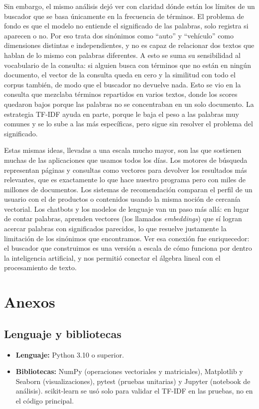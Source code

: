 \documentclass[12pt,a4paper]{article}
\begin{document}
Sin embargo, el mismo análisis dejó ver con claridad dónde están los límites de un buscador que se basa únicamente en la frecuencia de términos. El problema de fondo es que el modelo no entiende el significado de las palabras, solo registra si aparecen o no. Por eso trata dos sinónimos como ``auto'' y ``vehículo'' como dimensiones distintas e independientes, y no es capaz de relacionar dos textos que hablan de lo mismo con palabras diferentes. A esto se suma su sensibilidad al vocabulario de la consulta: si alguien busca con términos que no están en ningún documento, el vector de la consulta queda en cero y la similitud con todo el corpus también, de modo que el buscador no devuelve nada. Esto se vio en la consulta que mezclaba términos repartidos en varios textos, donde los scores quedaron bajos porque las palabras no se concentraban en un solo documento. La estrategia TF-IDF ayuda en parte, porque le baja el peso a las palabras muy comunes y se lo sube a las más específicas, pero sigue sin resolver el problema del significado.

Estas mismas ideas, llevadas a una escala mucho mayor, son las que sostienen muchas de las aplicaciones que usamos todos los días. Los motores de búsqueda representan páginas y consultas como vectores para devolver los resultados más relevantes, que es exactamente lo que hace nuestro programa pero con miles de millones de documentos. Los sistemas de recomendación comparan el perfil de un usuario con el de productos o contenidos usando la misma noción de cercanía vectorial. Los chatbots y los modelos de lenguaje van un paso más allá: en lugar de contar palabras, aprenden vectores (los llamados \textit{embeddings}) que sí logran acercar palabras con significados parecidos, lo que resuelve justamente la limitación de los sinónimos que encontramos. Ver esa conexión fue enriquecedor: el buscador que construimos es una versión a escala de cómo funciona por dentro la inteligencia artificial, y nos permitió conectar el álgebra lineal con el procesamiento de texto.

\newpage
\section{Anexos}

\subsection{Lenguaje y bibliotecas}
\begin{itemize}
    \item \textbf{Lenguaje:} Python 3.10 o superior.
    \item \textbf{Bibliotecas:} NumPy (operaciones vectoriales y matriciales), Matplotlib y Seaborn (visualizaciones), pytest (pruebas unitarias) y Jupyter (notebook de análisis). scikit-learn se usó solo para validar el TF-IDF en las pruebas, no en el código principal.
\end{itemize}
\end{document}
